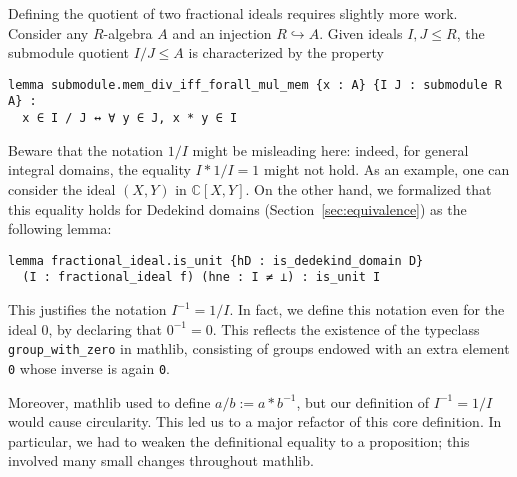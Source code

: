 \documentclass[a4paper,USenglish,cleveref, autoref, thm-restate]{lipics-v2021}
\newcommand{\C}{\mathbb{C}}
\newcommand{\lean}[1]{\texttt{#1}\xspace} %
\newcommand{\mathlib}{\textsf{mathlib}\xspace}
\begin{document}
Defining the quotient of two fractional ideals requires slightly more work. Consider any $R$-algebra $A$ and an injection $R\hookrightarrow A$. Given ideals $I,J\le R$, the submodule quotient $I / J\le A$ %
is characterized by the property
\begin{lstlisting}
lemma submodule.mem_div_iff_forall_mul_mem {x : A} {I J : submodule R A} :
  x ∈ I / J ↔ ∀ y ∈ J, x * y ∈ I
\end{lstlisting}
Beware that the notation $1/I$ might be misleading here: indeed, for general integral domains, the equality $I\ast 1/I=1$ might not hold. As an example, one can consider the ideal $(X,Y)$ in $\C[X,Y]$.
On the other hand, we formalized that this equality holds for Dedekind domains (Section~\ref{sec:equivalence}) as the following lemma:
\begin{lstlisting}
lemma fractional_ideal.is_unit {hD : is_dedekind_domain D}
  (I : fractional_ideal f) (hne : I ≠ ⊥) : is_unit I
\end{lstlisting}
This justifies the notation $I^{-1}=1/I$. In fact, we define this notation even for the ideal $0$, by declaring that $0^{-1}=0$. This reflects the existence of the typeclass \lean{group\_with\_zero} in \mathlib, consisting of groups endowed with an extra element \lean{0} whose inverse is again \lean{0}. %

Moreover, \mathlib used to define \lean{$a / b := a * b^{-1}$}, but our definition of $I^{-1} = 1 / I$ would cause circularity. This led us to a major refactor of this core definition. In particular, we had to weaken the definitional equality to a proposition; this involved many small changes throughout \mathlib.
\end{document}
